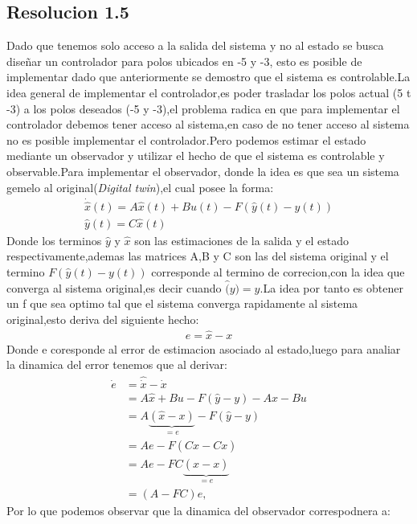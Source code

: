 \documentclass[
  11pt,
  letterpaper,
   addpoints,
   answers
  ]{exam}
\begin{document}
\begin{questions}
\begin{solution}
    \subsection*{Resolucion 1.5}
    Dado que tenemos solo acceso a la salida del sistema y no al estado se busca diseñar un controlador para polos ubicados en -5 y -3, esto es posible de implementar dado que anteriormente se demostro que el sistema es controlable.La idea general de implementar el controlador,es poder trasladar los polos actual (5 t -3) a los polos deseados (-5 y -3),el problema radica en que para implementar el controlador debemos tener acceso al sistema,en caso de no tener acceso al sistema no es posible implementar el controlador.Pero podemos estimar el estado mediante un observador y utilizar el hecho de que el sistema es controlable y observable.Para implementar el observador, donde la idea es que sea un sistema gemelo al original(\textit{Digital twin}),el cual posee la forma:
    \begin{align}
        \dot{\hat{x}}(t) = A\hat{x}(t) + Bu(t) - F(\hat{y}(t)-y(t))\\
        \hat{y}(t) = C\hat{x}(t)
    \end{align}
    Donde los terminos $\hat{y}$ y $\hat{x}$ son las estimaciones de la salida y el estado respectivamente,ademas las matrices A,B y C son las del sistema original y el termino $F(\hat{y}(t)-y(t))$ corresponde al termino de correcion,con la idea que converga al sistema original,es decir cuando $\hat(y)=y$.La idea por tanto es obtener un f que sea optimo tal que el sistema converga rapidamente al sistema original,esto deriva del siguiente hecho:
    \begin{align}
        e=\hat{x}-x
    \end{align}
    Donde e coresponde al error de estimacion asociado al estado,luego para analiar la dinamica del error tenemos que al derivar:
    \begin{align}
        \dot{e} &= \hat{\dot{x}} - \dot{x} \\
                &= A \hat{x} + Bu - F (\hat{y} - y) - A x - Bu \\
                &= A \underbrace{(\hat{x} - x)}_{=e} - F (\hat{y} - y) \\
                &= A e - F \left( C \hat{x} - C x \right) \\
                &= A e - FC \underbrace{(\hat{x} - x)}_{=e} \\
                &= (A - FC) e,
        \end{align}
    Por lo que podemos observar que la dinamica del observador correspodnera a:

\end{solution}
\end{questions}
\end{document}
